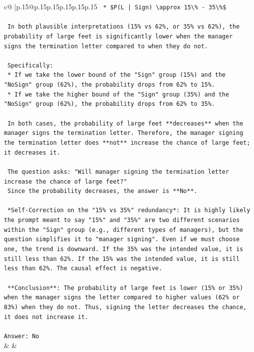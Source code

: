 \documentclass{article}
\begin{document}
{\begin{supertabular}{c@{$\;$}|p{.15\linewidth}@{}p{.15\linewidth}p{.15\linewidth}p{.15\linewidth}p{.15\linewidth}p{.15\linewidth}}
{{{\texttt{    *   \$P(L | Sign) \textbackslash{}approx 15\textbackslash{}\% {-} 35\textbackslash{}\%\$} \\
\\ 
\texttt{    In both plausible interpretations (15\% vs 62\%, or 35\% vs 62\%), the probability of large feet is significantly lower when the manager signs the termination letter compared to when they do not.} \\
\\ 
\texttt{    Specifically:} \\
\texttt{    *   If we take the lower bound of the "Sign" group (15\%) and the "NoSign" group (62\%), the probability drops from 62\% to 15\%.} \\
\texttt{    *   If we take the higher bound of the "Sign" group (35\%) and the "NoSign" group (62\%), the probability drops from 62\% to 35\%.} \\
\\ 
\texttt{    In both cases, the probability of large feet **decreases** when the manager signs the termination letter. Therefore, the manager signing the termination letter does **not** increase the chance of large feet; it decreases it.} \\
\\ 
\texttt{    The question asks: "Will manager signing the termination letter increase the chance of large feet?"} \\
\texttt{    Since the probability decreases, the answer is **No**.} \\
\\ 
\texttt{    *Self{-}Correction on the "15\% vs 35\%" redundancy*: It is highly likely the prompt meant to say "15\%" and "35\%" are two different scenarios within the "Sign" group (e.g., different types of managers), but the question simplifies it to "manager signing". Even if we must choose one, the trend is downward. If the 35\% was the intended value, it is still less than 62\%. If the 15\% was the intended value, it is still less than 62\%. The causal effect is negative.} \\
\\ 
\texttt{    **Conclusion**: The probability of large feet is lower (15\% or 35\%) when the manager signs the letter compared to higher values (62\% or 83\%) when they do not. Thus, signing the letter decreases the chance, it does not increase it.} \\
\\ 
\texttt{Answer: No} \\
            }
        }
    }
    & & \\ \\


\end{supertabular}}
\end{document}
